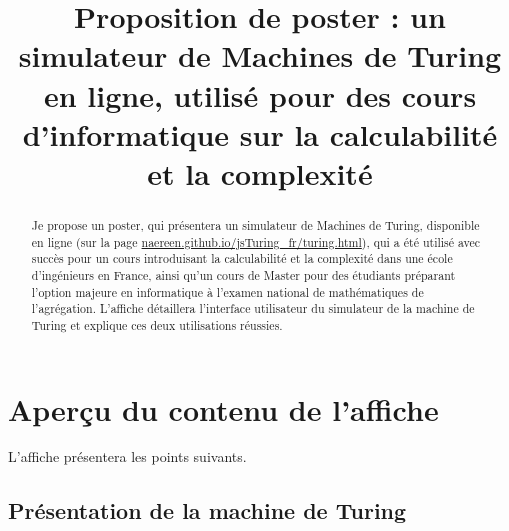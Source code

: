\documentclass[runningheads]{llncs}
\begin{document}
%
\title{Proposition de poster : un simulateur de Machines de Turing en ligne, utilisé pour des cours d'informatique sur la calculabilité et la complexité}%
%
%
\maketitle              %
%
\begin{abstract}
    Je propose un poster, qui présentera un simulateur de Machines de Turing, disponible en ligne (sur la page \url{naereen.github.io/jsTuring_fr/turing.html}),
    qui a été utilisé avec succès pour un cours introduisant la calculabilité et la complexité dans une école d'ingénieurs en France,
    ainsi qu'un cours de Master pour des étudiants préparant l'option majeure en informatique à l'examen national de mathématiques de l'agr{\'e}gation.
    L'affiche détaillera l'interface utilisateur du simulateur de la machine de Turing et explique ces deux utilisations réussies.

\end{abstract}
%
%
%

\section*{Aperçu du contenu de l'affiche}

L'affiche présentera les points suivants.

\subsection*{Présentation de la machine de Turing}
\end{document}
